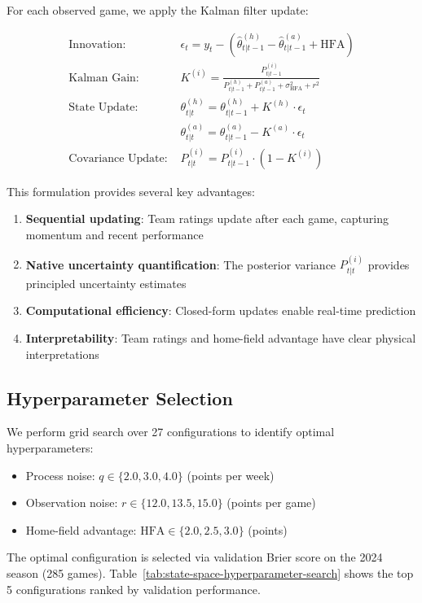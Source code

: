 For each observed game, we apply the Kalman filter update:

\begin{align}
\text{Innovation: } & \epsilon_t = y_t - (\hat{\theta}_{t|t-1}^{(h)} - \hat{\theta}_{t|t-1}^{(a)} + \text{HFA}) \\
\text{Kalman Gain: } & K^{(i)} = \frac{P_{t|t-1}^{(i)}}{P_{t|t-1}^{(h)} + P_{t|t-1}^{(a)} + \sigma_{\text{HFA}}^2 + r^2} \\
\text{State Update: } & \theta_{t|t}^{(h)} = \theta_{t|t-1}^{(h)} + K^{(h)} \cdot \epsilon_t \\
                        & \theta_{t|t}^{(a)} = \theta_{t|t-1}^{(a)} - K^{(a)} \cdot \epsilon_t \\
\text{Covariance Update: } & P_{t|t}^{(i)} = P_{t|t-1}^{(i)} \cdot (1 - K^{(i)})
\end{align}

This formulation provides several key advantages:
\begin{enumerate}
    \item \textbf{Sequential updating}: Team ratings update after each game, capturing momentum and recent performance
    \item \textbf{Native uncertainty quantification}: The posterior variance $P_{t|t}^{(i)}$ provides principled uncertainty estimates
    \item \textbf{Computational efficiency}: Closed-form updates enable real-time prediction
    \item \textbf{Interpretability}: Team ratings and home-field advantage have clear physical interpretations
\end{enumerate}

\subsection{Hyperparameter Selection}

We perform grid search over 27 configurations to identify optimal hyperparameters:

\begin{itemize}
    \item Process noise: $q \in \{2.0, 3.0, 4.0\}$ (points per week)
    \item Observation noise: $r \in \{12.0, 13.5, 15.0\}$ (points per game)
    \item Home-field advantage: $\text{HFA} \in \{2.0, 2.5, 3.0\}$ (points)
\end{itemize}

The optimal configuration is selected via validation Brier score on the 2024 season (285 games). Table~\ref{tab:state-space-hyperparameter-search} shows the top 5 configurations ranked by validation performance.

